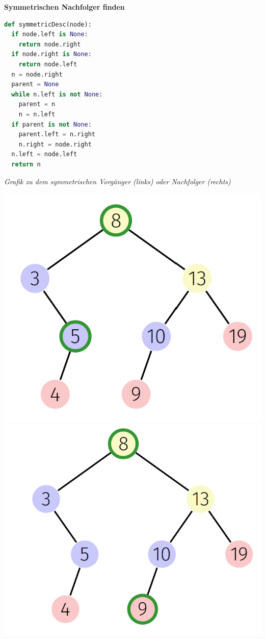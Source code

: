 \begin{sectionbox}
\textbf{Symmetrischen Nachfolger finden}\par\vspace{-4px}
\begin{lstlisting}[language=Python]
def symmetricDesc(node):
  if node.left is None:
    return node.right
  if node.right is None:
    return node.left
  n = node.right
  parent = None
  while n.left is not None:
    parent = n
    n = n.left
  if parent is not None:
    parent.left = n.right
    n.right = node.right
  n.left = node.left
  return n
\end{lstlisting}\vspace{-6px}

\end{sectionbox}

\begin{sectionbox}
\textit{Grafik zu dem symmetrischen Vorgänger (links) oder Nachfolger (rechts)}\par
\begin{center}
\includegraphics[width = 0.4\columnwidth]{../img/symVorg.png}
\tab \includegraphics[width = 0.4\columnwidth]{../img/symNachf.png}    
\end{center}
\end{sectionbox}


